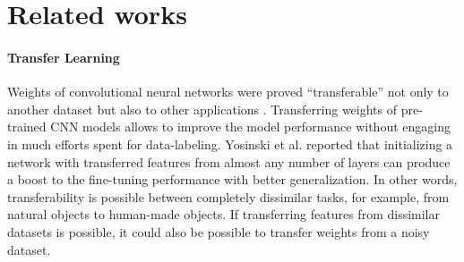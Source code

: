\section{Related works}
\label{sec:related}

%



\paragraph{Transfer Learning}


Weights of convolutional neural networks were proved ``transferable'' not only to another dataset \cite{shin2016deep,yosinski2014transferable} but also to other applications \cite{girshick2014rich,long2015fully}.
Transferring weights of pre-trained CNN models allows to improve the model performance without engaging in much efforts spent for data-labeling. \cite{pan2010survey}
Yosinski et al. \cite{yosinski2014transferable} reported that initializing a network with transferred features from almost any number of layers can produce a boost to the fine-tuning performance with better generalization.
In other words, transferability is possible between completely dissimilar tasks, for example, from natural objects to human-made objects.
If transferring features from dissimilar datasets is possible,  it could also be possible to transfer weights from a noisy dataset.

